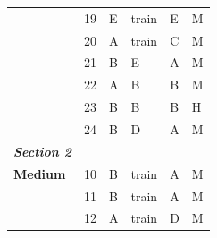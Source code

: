 \documentclass[pageno]{final_paper}
\newcommand{\textbi}[1]{\textbf{\textit{#1}}}
\begin{document}
\begin{table}[]
\begin{tabular}{llllll}
\textbf{}                & 19                                  & E                                          & train                                       & E                                           & M                                       \\
\textbf{}                & 20                                  & A                                          & train                                       & C                                           & M                                       \\
\textbf{}                & 21                                  & B                                          & E                                           & A                                           & M                                       \\
\textbf{}                & 22                                  & A                                          & B                                           & B                                           & M                                       \\
\textbf{}                & 23                                  & B                                          & B                                           & B                                           & H                                       \\
\textbf{}                & 24                                  & B                                          & D                                           & A                                           & M                                       \\ \midrule
\textbi{Section 2}       &                                     &                                            &                                             &                                             &                                         \\ \midrule
\textbf{Medium}          & 10                                  & B                                          & train                                       & A                                           & M                                       \\
\textbf{}                & 11                                  & B                                          & train                                       & A                                           & M                                       \\
\textbf{}                & 12                                  & A                                          & train                                       & D                                           & M                                       \\

\end{tabular}
\end{table}
\end{document}

